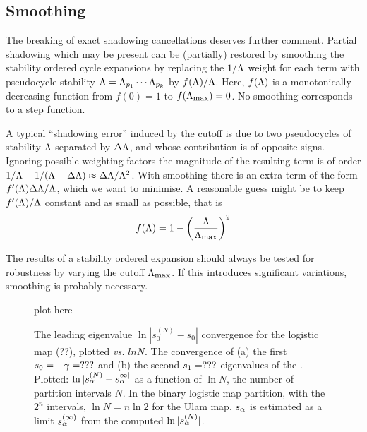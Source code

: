 \subsection{Smoothing}
\label{s-Smoothing}

The breaking of exact shadowing cancellations deserves further comment.
Partial shadowing which may be present can be (partially) restored by smoothing
the stability ordered cycle expansions by replacing the
$1/\Lambda$ weight for each term with
pseudocycle stability
$\Lambda=
\Lambda_{p_1}\cdots\Lambda_{p_k}$ by $f(\Lambda)/\Lambda$.
Here, $f(\Lambda)$ is a monotonically decreasing function from $f(0)=1$ to
$f(\stabCutoff)=0$.  No smoothing corresponds to a step function.

A typical ``shadowing error'' induced by the cutoff is due to two
pseudocycles of stability $\Lambda$ separated by $\Delta\Lambda$, and
whose contribution is of opposite signs.
Ignoring possible weighting factors the magnitude of the resulting term
is of order
$1/\Lambda-1/(\Lambda+\Delta\Lambda)
\approx\Delta\Lambda/\Lambda^2$.
With smoothing there is an
extra term of the form $f'(\Lambda)\Delta\Lambda/\Lambda$, which we
want to minimise.  A reasonable guess might be to keep $f'(\Lambda)/\Lambda$
constant and as small as possible, that is
\[
f(\ExpaEig)=1-\left(\frac{\ExpaEig}{\stabCutoff}\right)^2
\]

The results of a stability ordered expansion
should always be tested for
robustness by varying the cutoff  $\stabCutoff$.
If this introduces significant variations,
smoothing is probably necessary.

\begin{figure}
\begin{center}
plot here %
\end{center}
\caption{
    {\small
The leading eigenvalue $\ln | s_0^{(N)} - s_0|$
convergence for the
logistic map (??), plotted {\em vs.} $ln N$.
The convergence of
(a)  the first $s_0 = - \gamma = ???$
and
(b)  the second $s_1 = ???$ eigenvalues
of the
\FP. Plotted:
$\ln |s_\alpha^{(N)}-s_\alpha^{\infty|}$
as a function of $\ln N$,
the number of partition intervals $N$.
In the binary
logistic map partition, with the $2^n$ intervals,
$\ln N= n \ln 2$ for the Ulam map.
$s_\alpha$ is estimated as a limit
$s_\alpha^{(\infty)}$ from the computed
$\ln |s_\alpha^{(N)}|$.
        }}
\label{fig:logStabOrder1}
\end{figure}

